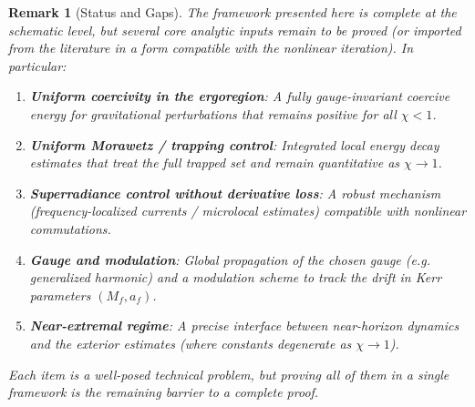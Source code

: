 \documentclass[12pt,a4paper]{article}
\newtheorem{remark}[theorem]{Remark}
\begin{document}
\begin{center}
\end{center}

\begin{remark}[Status and Gaps]
The framework presented here is complete at the schematic level, but several core analytic inputs remain to be proved (or imported from the literature in a form compatible with the nonlinear iteration). In particular:
\begin{enumerate}
    \item \textbf{Uniform coercivity in the ergoregion}: A fully gauge-invariant coercive energy for gravitational perturbations that remains positive for all $\chi<1$.
    \item \textbf{Uniform Morawetz / trapping control}: Integrated local energy decay estimates that treat the full trapped set and remain quantitative as $\chi\to 1$.
    \item \textbf{Superradiance control without derivative loss}: A robust mechanism (frequency-localized currents / microlocal estimates) compatible with nonlinear commutations.
    \item \textbf{Gauge and modulation}: Global propagation of the chosen gauge (e.g. generalized harmonic) and a modulation scheme to track the drift in Kerr parameters $(M_f,a_f)$.
    \item \textbf{Near-extremal regime}: A precise interface between near-horizon dynamics and the exterior estimates (where constants degenerate as $\chi\to 1$).
\end{enumerate}
Each item is a well-posed technical problem, but proving all of them in a single framework is the remaining barrier to a complete proof.
\end{remark}
\end{document}
